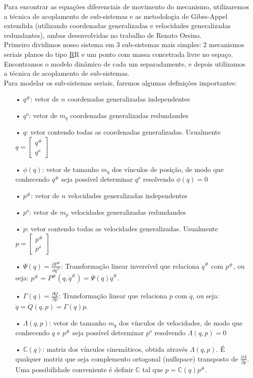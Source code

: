 \documentclass[12pt,a4paper]{article}
\begin{document}
Para encontrar as equações diferenciais de movimento do mecanismo, utilizaremos a técnica de acoplamento de sub-sistemas e as metodologia de Gibss-Appel extendida (utilizando coordenadas generalizadas e velocidades generalizadas redundantes), ambas desenvolvidas no trabalho de Renato Orsino. \\

Primeiro dividimos nosso sistema em 3 sub-sistemas mais simples: 2 mecanismos seriais planos do tipo \underline{R}R e um ponto com massa concetrada livre no espaço. Encontramos o modelo dinâmico de cada um separadamente, e depois utilizamos a técnica de acoplamento de sub-sistemas. \\

Para modelar os sub-sistemas seriais, faremos algumas definições importantes:

\begin{itemize}
\item[•]$q^{\#}$: vetor de $n$ coordenadas generalizadas independentes
\item[•]$q^o$: vetor de $m_q$ coordenadas generalizadas redundandes
\item[•]$q$: vetor contendo todas as coordenadas generalizadas. Usualmente $q = \begin{bmatrix} q^{\#} \\q^o \end{bmatrix} $
\item[•]$\phi(q)$: vetor de tamanho $m_q$ dos vínculos de posição, de modo que conhecendo $q^{\#}$ seja possível determinar $q^o$ resolvendo $\phi(q) = 0$
\item[•]$p^{\#}$: vetor de $n$ velocidades generalizadas independentes
\item[•]$p^o$: vetor de $m_p$ velocidades generalizadas redundandes
\item[•]$p$: vetor contendo todas as velocidades generalizadas. Usualmente $p = \begin{bmatrix} p^{\#} \\p^o \end{bmatrix} $
\item[•]$ \Psi(q) = \frac{\partial P^{\#}}{\partial \dot{q}^{\#}}$: Transformação linear inversível que relaciona $ \dot{q}^{\#}$ com $p^{\#}$, ou seja: $ p^{\#} = P^{\#} (q,\dot{q}^{\#}) = \Psi(q) \dot{q}^{\#} $.
\item[•]$ \Gamma(q) = \frac{\partial \dot{Q}}{\partial p}$: Transformação linear que relaciona $p$ com $\dot{q}$, ou seja: $ \dot{q} = \dot{Q} (q,p) = \Gamma(q) p $.
\item[•]$\Lambda(q,p)$: vetor de tamanho $m_q$ dos vínculos de velocidades, de modo que conhecendo $q$ e $p^{\#}$ seja possível determinar $p^o$ resolvendo $\Lambda(q,p) = 0$
\item[•] $\mathbb{C}(q)$: matriz dos vínculos cinemáticos, obtida através $\Lambda(q,p)$. É qualquer matriz que seja complemento ortogonal (nullspace) transposto de $\frac{\partial \Lambda}{\partial p}$. Uma possibilidade conveniente é definir $\mathbb{C}$ tal que $p = \mathbb{C}(q) p^{\#}$.
\end{itemize}
\end{document}

